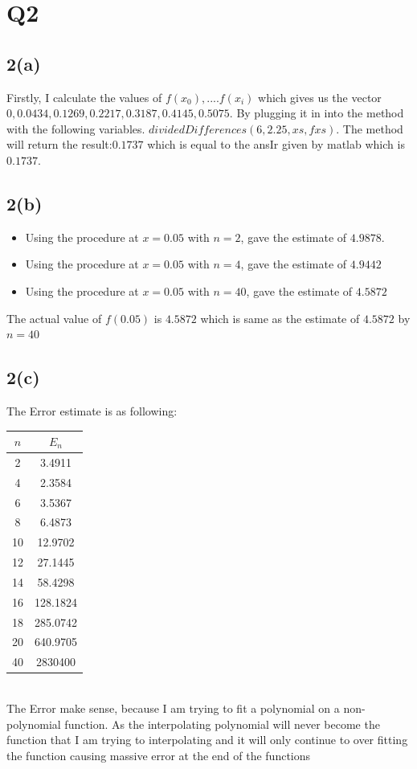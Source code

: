 \documentclass{article}
\begin{document}
\section{Q2}
\subsection*{2(a)}
Firstly, I calculate the values of $f(x_0),....f(x_i)$ which gives us the vector $0, 0.0434,
0.1269, 0.2217, 0.3187, 0.4145, 0.5075$. By plugging it in into the method with the following variables.
$dividedDifferences(6,2.25,xs,fxs)$. The method will return the result:$0.1737$ 
which is equal to the ansIr given by matlab which is $0.1737$.
\subsection*{2(b)}
\begin{itemize}
	\item Using the procedure at $x=0.05$ with $n=2$, gave the estimate of $4.9878$.
	\item Using the procedure at $x=0.05$ with $n=4$, gave the estimate of $4.9442$
	\item Using the procedure at $x=0.05$ with $n=40$, gave the estimate of $4.5872$
\end{itemize}
The actual value of $f(0.05)$ is $4.5872$ which is same as the estimate of $4.5872$ by $n=40$
\subsection*{2(c)}
The Error estimate is as following:\\
\begin{tabular}{|c|c|}
\hline
$n$ & $E_n$ \\ \hline
2 & 3.4911\\
4 & 2.3584\\
6 & 3.5367\\
8 & 6.4873\\
10 & 12.9702\\
12 & 27.1445\\
14 & 58.4298\\
16 & 128.1824\\
18 & 285.0742\\
20 & 640.9705\\
40 & 2830400\\
\hline
\end{tabular}\\
The Error make sense, because I am trying to fit a polynomial on a non-polynomial function. As the interpolating polynomial will never become the function that I am trying to interpolating and it will only continue to over fitting the function causing massive error at the end of the functions
\end{document}
